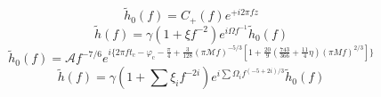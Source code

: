 \begin{equation}
    \tilde{h}_0(f)=C_+(f)e^{+i2\pi fz}
\end{equation}
\begin{equation}
    \tilde{h}(f)=\gamma(1+\xi f^{-2})e^{i\Omega f^{-1}}\tilde{h}_0(f)
\end{equation}
\begin{equation}
    \tilde{h}_0(f)=\mathcal{A}f^{-7/6}e^{i\{2\pi ft_\text{c}-\varphi_\text{c}-\frac{\pi}{4}+\frac{3}{128}(\pi\mathcal{M}f)^{-5/3}[1+\frac{20}{9}(\frac{743}{366}+\frac{11}{4}\eta)(\pi Mf)^{2/3}]\}}
\end{equation}
\begin{equation}
    \tilde{h}(f)=\gamma(1+\sum\xi_i f^{-2i})e^{i\sum\Omega_i f^{(-5+2i)/3}}\tilde{h}_0(f)
\end{equation}
